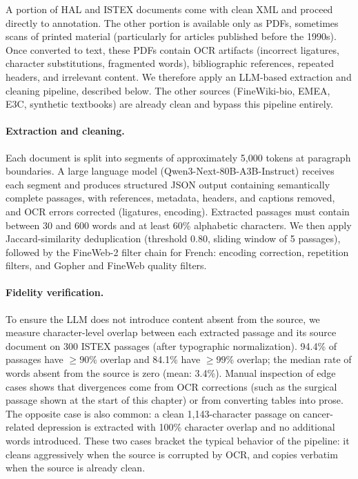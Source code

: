 \begin{reviewread}
A portion of HAL and ISTEX documents come with clean XML and proceed directly to annotation. The other portion is available only as PDFs, sometimes scans of printed material (particularly for articles published before the 1990s). Once converted to text, these PDFs contain OCR artifacts (incorrect ligatures, character substitutions, fragmented words), bibliographic references, repeated headers, and irrelevant content. We therefore apply an LLM-based extraction and cleaning pipeline, described below. The other sources (FineWiki-bio, EMEA, E3C, synthetic textbooks) are already clean and bypass this pipeline entirely.
\end{reviewread}

\paragraph{Extraction and cleaning.} Each document is split into segments of approximately 5{,}000 tokens at paragraph boundaries. A large language model (Qwen3-Next-80B-A3B-Instruct) receives each segment and produces structured JSON output containing semantically complete passages, with references, metadata, headers, and captions removed, and OCR errors corrected (ligatures, encoding). Extracted passages must contain between 30 and 600 words and at least 60\% alphabetic characters. We then apply Jaccard-similarity deduplication (threshold 0.80, sliding window of 5 passages), followed by the FineWeb-2 filter chain for French: encoding correction, repetition filters, and Gopher and FineWeb quality filters.

\paragraph{Fidelity verification.} To ensure the LLM does not introduce content absent from the source, we measure character-level overlap between each extracted passage and its source document on 300 ISTEX passages (after typographic normalization). 94.4\% of passages have $\geq 90$\% overlap and 84.1\% have $\geq 99$\% overlap; the median rate of words absent from the source is zero (mean: 3.4\%). Manual inspection of edge cases shows that divergences come from OCR corrections (such as the surgical passage shown at the start of this chapter) or from converting tables into prose. The opposite case is also common: a clean 1{,}143-character passage on cancer-related depression is extracted with 100\% character overlap and no additional words introduced. These two cases bracket the typical behavior of the pipeline: it cleans aggressively when the source is corrupted by OCR, and copies verbatim when the source is already clean.

